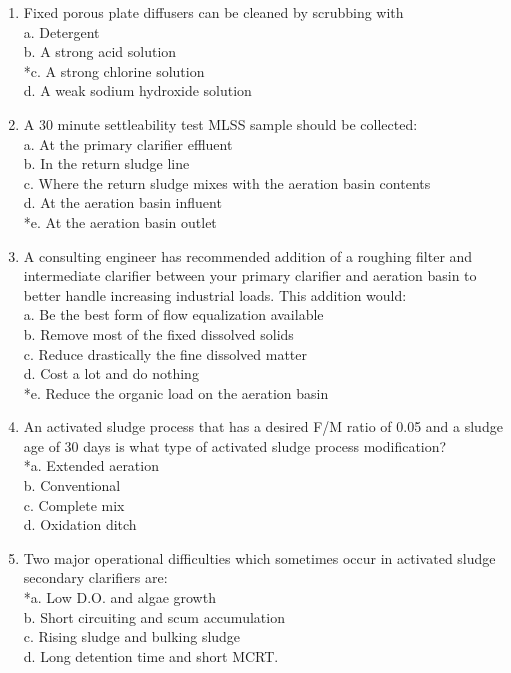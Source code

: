 \begin{enumerate}
\item Fixed porous plate diffusers can be cleaned by scrubbing with \\
a. Detergent \\
b. A strong acid solution \\
*c. A strong chlorine solution \\
d. A weak sodium hydroxide solution \\

\item A 30 minute settleability test MLSS sample should be collected: \\
a. At the primary clarifier effluent \\
b. In the return sludge line \\
c. Where the return sludge mixes with the aeration basin contents \\
d. At the aeration basin influent \\
*e. At the aeration basin outlet \\

\item A consulting engineer has recommended addition of a roughing filter and intermediate clarifier between your primary clarifier and aeration basin to better handle increasing industrial loads. This addition would: \\
a. Be the best form of flow equalization available \\
b. Remove most of the fixed dissolved solids \\
c. Reduce drastically the fine dissolved matter \\
d. Cost a lot and do nothing \\
*e. Reduce the organic load on the aeration basin \\


\item An activated sludge process that has a desired F/M ratio of 0.05 and a sludge age of 30 days is what type of activated sludge process modification? \\
*a. Extended aeration \\
b. Conventional \\
c. Complete mix \\
d. Oxidation ditch \\

\item Two major operational difficulties which sometimes occur in activated sludge secondary clarifiers are: \\
*a. Low D.O. and algae growth \\
b. Short circuiting and scum accumulation \\
c. Rising sludge and bulking sludge \\
d. Long detention time and short MCRT. \\


\end{enumerate}
